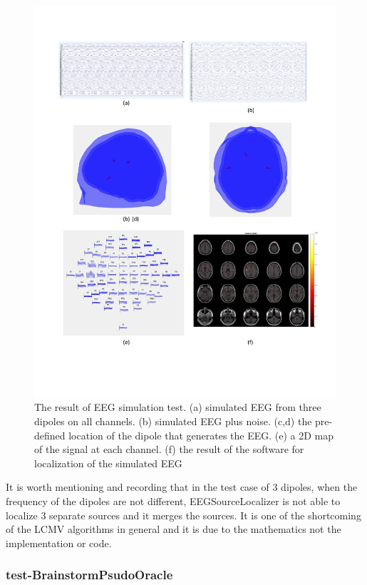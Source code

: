 \documentclass[12pt, titlepage]{article}
\renewcommand{\progname}{EEGSourceLocalizer}
\begin{document}
\begin{figure}[H]
\centering
  \includegraphics[scale=0.6]{3dipolsim_test.pdf}
  \caption{The result of EEG simulation test. (a) simulated EEG from three dipoles on all channels. (b) simulated EEG plus noise. (c,d) the pre-defined location of the dipole that generates the EEG. (e) a 2D map of the signal at each channel. (f) the result of the software for localization of the simulated EEG  }
\label{Fig_3dip}
\end{figure}

It is worth mentioning and recording that in the test case of 3 dipoles, when the frequency of the dipoles are not different, \progname{} is not able to localize 3 separate sources and it merges the sources. It is one of the shortcoming of the LCMV algorithms in general and it is due to the mathematics not the implementation or code.

\subsubsection{test-BrainstormPsudoOracle}
\label{test-BrainstormPsudoOracle}
\end{document}
